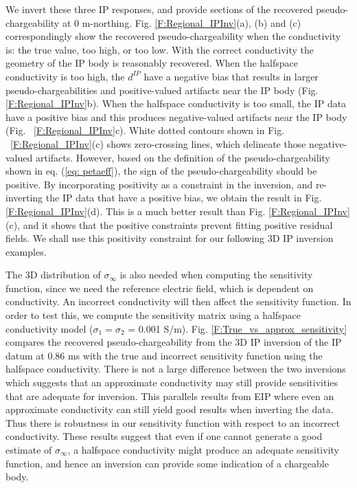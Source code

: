 \documentclass[extra,mreferee]{gji}
\newcommand{\siginf}{\sigma_\infty}
\newcommand{\dip}{d^{IP}}
\begin{document}
We invert these three IP responses, and provide sections of the recovered pseudo-chargeability at 0 m-northing.
Fig. \ref{F:Regional_IPInv}(a), (b) and (c) correspondingly show the recovered pseudo-chargeability when the conductivity is: the true value, too high, or too low.
With the correct conductivity the geometry of the IP body is reasonably recovered.
When the halfspace conductivity is too high, the $\dip$ have a negative bias that results in larger pseudo-chargeabilities and positive-valued artifacts near the IP body (Fig. \ref{F:Regional_IPInv}b).
When the halfspace conductivity is too small, the IP data have a positive bias and this produces negative-valued artifacts near the IP body (Fig. ~\ref{F:Regional_IPInv}c). White dotted contours shown in Fig. ~\ref{F:Regional_IPInv}(c) shows zero-crossing lines, which delineate those negative-valued artifacts. However, based on the  definition of the pseudo-chargeability shown in eq. (\ref{eq: petaeff}), the sign of the pseudo-chargeability should be positive. By incorporating positivity as a constraint in the inversion, and re-inverting the IP data that have a positive bias, we obtain the result in  Fig. \ref{F:Regional_IPInv}(d).  This is a much better result than Fig. \ref{F:Regional_IPInv}(c), and it shows that the positive constraints prevent fitting positive residual fields.
We shall use this positivity  constraint for our following 3D IP inversion examples.

The 3D distribution of $\siginf$ is also needed when computing the sensitivity function, since we need the reference electric field, which is dependent on conductivity.
An incorrect conductivity will then affect the sensitivity function.
In order to test this, we compute the sensitivity matrix using a halfspace conductivity model ($\sigma_1=\sigma_2$ = 0.001 S/m).
Fig. \ref{F:True_vs_approx_sensitivity} compares the recovered pseudo-chargeability from the 3D IP inversion of the IP datum at 0.86 ms with the true and incorrect sensitivity function using the halfspace conductivity.
There is not a large difference between the two inversions  which suggests that an approximate conductivity may still provide sensitivities that are adequate for inversion. This parallels results from EIP where even an approximate conductivity can still yield good results when inverting the data. Thus there is robustness in our sensitivity function with respect to an  incorrect conductivity.
These results suggest that even if one cannot generate a good estimate of
$\siginf$, a halfspace conductivity might produce an adequate sensitivity function, and hence an inversion can provide some indication of a chargeable body.
\end{document}
